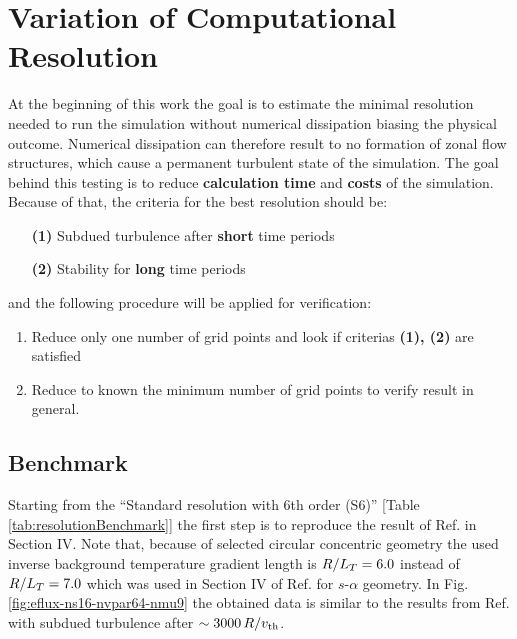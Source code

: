 \section{Variation of Computational Resolution}
\label{sec:variationsofresolution}

At the beginning of this work the goal is to estimate the minimal resolution needed to run the simulation without numerical dissipation biasing the physical outcome. Numerical dissipation can therefore result to no formation of zonal flow structures, which cause a permanent turbulent state of the simulation. The goal behind this testing is to reduce \textbf{calculation time} and \textbf{costs} of the simulation. \\
Because of that, the criteria for the best resolution should be:
\begin{enumerate}
	\item[\textbf{(1)}] Subdued turbulence after \textbf{short} time periods
	\item[\textbf{(2)}] Stability for \textbf{long} time periods 
\end{enumerate}
and the following procedure will be applied for verification:
\begin{enumerate}
	\item Reduce only one number of grid points and look if criterias \textbf{(1), (2)} are satisfied
	\item Reduce to known the minimum number of grid points to verify result in general.
\end{enumerate}

\subsection{Benchmark}
\label{sub:benchmark}

Starting from the \enquote{Standard resolution with 6th order (S6)} [Table \ref{tab:resolutionBenchmark}] the first step is to reproduce the result of Ref.  in Section IV. Note that, because of selected circular concentric geometry the used inverse background temperature gradient length is $R/L_T = 6.0$ instead of $R/L_T = 7.0$ which was used in Section IV of Ref.  for $s$-$\alpha$ geometry. In Fig. \ref{fig:eflux-ns16-nvpar64-nmu9} the obtained data is similar to the results from Ref.  with subdued turbulence after $\sim 3000\,R/v_{\mathrm{th}}$. 


